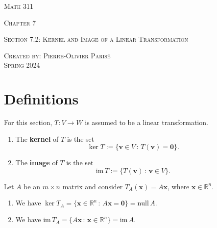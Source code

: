 \documentclass[20pt,a4paper]{extarticle}
\newcommand{\ra}{\rightarrow}
\newcounter{example}
\newcounter{definition}
\begin{document}
\thispagestyle{empty}

\begin{center}
\vspace*{0.75cm}

{\Huge \textsc{Math 311}}

\vspace*{1.5cm}

{\LARGE \textsc{Chapter 7}} 

\vspace*{0.75cm}

\noindent\textsc{Section 7.2: Kernel and Image of a Linear Transformation}

\vspace*{0.25cm}

\tableofcontents

\vfill

\noindent \textsc{Created by: Pierre-Olivier Paris{\'e}} \\
\textsc{Spring 2024}
\end{center}

\newpage

\section{Definitions}

For this section, $T : V \ra W$ is assumed to be a linear transformation.

\begin{definition}
\begin{enumerate}[label=\Circled{\arabic*}]
	\item The \textbf{kernel} of $T$ is the set
		\[
			\ker T := \{ \mathbf{v} \in V \, : \, T (\mathbf{v}) = \mathbf{0} \} .
		\]
	\item The \textbf{image} of $T$ is the set
		\[
			\mathrm{im}\, T := \{ T (\mathbf{v}) \, : \, \mathbf{v} \in V \} .
		\]
\end{enumerate}
\end{definition}

\begin{example}
Let $A$ be an $m \times n$ matrix and consider $T_A (\mathbf{x}) = A \mathbf{x}$, where $\mathbf{x} \in \mathbb{R}^n$. 
	\begin{enumerate}[label=\alph*)]
		\item We have $\ker T_A = \{ \mathbf{x} \in \mathbb{R}^n \, : \, A \mathbf{x} = \mathbf{0} \} = \mathrm{null} \, A$.
		\item We have $\mathrm{im} \, T_A = \{ A \mathbf{x} \, : \, \mathbf{x} \in \mathbb{R}^n \} = \mathrm{im} \, A$.
	\end{enumerate}
\end{example}
\end{document}
